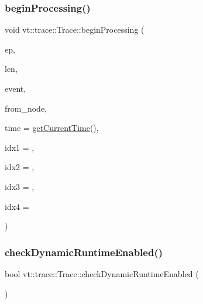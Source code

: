 \subsubsection{\texorpdfstring{begin\+Processing()}{beginProcessing()}}
{\footnotesize\ttfamily void vt\+::trace\+::\+Trace\+::begin\+Processing (\begin{DoxyParamCaption}\item[{\hyperlink{namespacevt_1_1trace_a3c14050715ba9eceaeff51fb3de64f2f}{Trace\+Entry\+I\+D\+Type} const}]{ep,  }\item[{\hyperlink{namespacevt_1_1trace_aeb598f45d67d41db7902e494f2f0ce59}{Trace\+Msg\+Len\+Type} const}]{len,  }\item[{\hyperlink{namespacevt_1_1trace_a64a7185f3e102df8d8258f263ccd1582}{Trace\+Event\+I\+D\+Type} const}]{event,  }\item[{\hyperlink{namespacevt_a866da9d0efc19c0a1ce79e9e492f47e2}{Node\+Type} const}]{from\+\_\+node,  }\item[{double const}]{time = {\ttfamily \hyperlink{structvt_1_1trace_1_1_trace_a04cf6b76b4ced1bc90d246a34c948db5}{get\+Current\+Time}()},  }\item[{uint64\+\_\+t const}]{idx1 = {},  }\item[{uint64\+\_\+t const}]{idx2 = {},  }\item[{uint64\+\_\+t const}]{idx3 = {},  }\item[{uint64\+\_\+t const}]{idx4 = {} }\end{DoxyParamCaption})}

\mbox{\label{structvt_1_1trace_1_1_trace_a4b911a4f90a4b6b76c03341db7d94fdd}} 
\subsubsection{\texorpdfstring{check\+Dynamic\+Runtime\+Enabled()}{checkDynamicRuntimeEnabled()}}
{\footnotesize\ttfamily bool vt\+::trace\+::\+Trace\+::check\+Dynamic\+Runtime\+Enabled (\begin{DoxyParamCaption}{ }\end{DoxyParamCaption})}

\mbox{\label{structvt_1_1trace_1_1_trace_ac764c356a7f81abadfe643d618f22b15}} 
